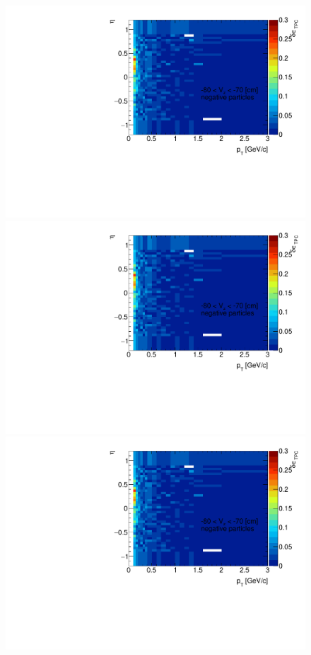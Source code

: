 \begin{figure}[H]
{	}~
	\parbox{0.325\textwidth}{
		\includegraphics[width=\linewidth,page=2]{graphics/systematicsEfficiency/deadMaterial/secondaries_Unbinned_Charged_CD.pdf}\\
		\includegraphics[width=\linewidth,page=5]{graphics/systematicsEfficiency/deadMaterial/secondaries_Unbinned_Charged_CD.pdf}\\
		\includegraphics[width=\linewidth,page=8]{graphics/systematicsEfficiency/deadMaterial/secondaries_Unbinned_Charged_CD.pdf}\\
}
\end{figure}
